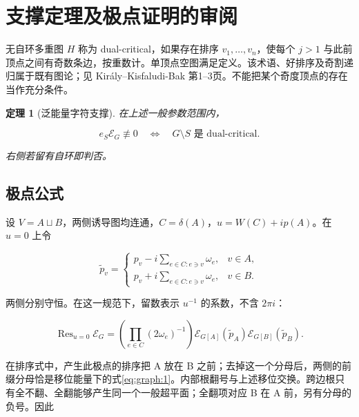\documentclass[11pt,a4paper,oneside]{ctexrep}
\theoremstyle{cnplain}
\newtheorem{theorem}{定理}[chapter]
\theoremstyle{definition}
\theoremstyle{remark}
\begin{document}
\section{支撑定理及极点证明的审阅}\label{sec:graph:2}

无自环多重图 \(H\) 称为 dual-critical，如果存在排序 \(v_1,\ldots,v_n\)，使每个 \(j>1\) 与此前顶点之间有奇数条边，按重数计。单顶点空图满足定义。该术语、好排序及奇割递归属于既有图论；见 Király--Kisfaludi-Bak \cite{dualcritical} 第1--3页。不能把某个奇度顶点的存在当作充分条件。

\begin{theorem}[泛能量字符支撑]

\label{thm:graph:1} 在上述一般参数范围内，

\begin{equation}
e_S\mathscr E_G\not\equiv0
 \quad\Longleftrightarrow\quad G\setminus S\text{ 是 dual-critical}.       \label{eq:graph:2}
\end{equation}

右侧若留有自环即判否。

\end{theorem}

\subsection{极点公式}\label{sec:graph:2.1}

设 \(V=A\sqcup B\)，两侧诱导图均连通，\(C=\delta(A)\)，\(u=W(C)+ip(A)\)。在 \(u=0\) 上令

\begin{equation}
\widetilde p_v=
 \begin{cases}
 p_v-i\sum_{e\in C:e\ni v}\omega_e,&v\in A,\\
 p_v+i\sum_{e\in C:e\ni v}\omega_e,&v\in B.
 \end{cases}
\end{equation}

两侧分别守恒。在这一规范下，留数表示 \(u^{-1}\) 的系数，不含 \(2\pi i\)：

\begin{equation}
\operatorname{Res}_{u=0}\mathscr E_G
 =\left(\prod_{e\in C}(2\omega_e)^{-1}\right)
   \mathscr E_{G[A]}(\widetilde p_A)
   \mathscr E_{G[B]}(\widetilde p_B).                         \label{eq:graph:3}
\end{equation}

在排序式中，产生此极点的排序把 A 放在 B 之前；去掉这一个分母后，两侧的前缀分母恰是移位能量下的式\eqref{eq:graph:1}。内部根翻号与上述移位交换。跨边根只有全不翻、全翻能够产生同一个一般超平面；全翻项对应 B 在 A 前，另有分母的负号。因此
\end{document}
